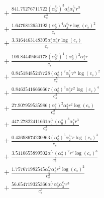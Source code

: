 \documentclass[10pt]{article}
\begin{document}
\begin{align*}
&{}  + \frac{841.75276711722 \left(\alpha_{0}^{c_s}\right)^{3} \alpha_{0}^s \alpha_{1}^{c_s} r^{3}}{c_{s}^{3}} \\
&{}  + \frac{1.6470812650193 \left(\alpha_{0}^s\right)^{4} \alpha_{3}^{c_s} r \log{\left(c_{s} \right)}^{2}}{c_{s}} \\
&{}  + \frac{3.3164463148305 \alpha_{2}^s \alpha_{4}^s r \log{\left(c_{s} \right)}}{c_{s}} \\
&{}  + \frac{106.84449464178 \left(\alpha_{0}^{c_s}\right)^{4} \left(\alpha_{0}^s\right)^{2} \alpha_{1}^s r}{c_{s}} \\
&{}  + \frac{0.84518485247728 \left(\alpha_{0}^s\right)^{2} \alpha_{1}^{c_s} r^{5} \log{\left(c_{s} \right)}^{2}}{c_{s}^{5}} \\
&{}  + \frac{0.84635416666667 \left(\alpha_{0}^s\right)^{3} \alpha_{3}^s r^{2} \log{\left(c_{s} \right)}^{4}}{c_{s}^{2}} \\
&{}  + \frac{27.907959535986 \left(\alpha_{1}^s\right)^{2} \alpha_{2}^s r^{2} \log{\left(c_{s} \right)}}{c_{s}^{2}} \\
&{}  + \frac{447.27822411661 \alpha_{0}^{c_s} \left(\alpha_{0}^s\right)^{3} \alpha_{1}^s r^{3}}{c_{s}^{3}} \\
&{}  + \frac{0.43698674230963 \left(\alpha_{0}^s\right)^{5} \alpha_{2}^{c_s} r \log{\left(c_{s} \right)}^{3}}{c_{s}} \\
&{}  + \frac{3.5110655899502 \alpha_{0}^{c_s} \left(\alpha_{2}^s\right)^{2} r^{2} \log{\left(c_{s} \right)}^{3}}{c_{s}^{2}} \\
&{}  + \frac{1.757671982545 \alpha_{2}^{c_s} \alpha_{3}^s r^{2} \log{\left(c_{s} \right)}^{2}}{c_{s}^{2}} \\
&{}  + \frac{56.654719325366 \alpha_{0}^{c_s} \alpha_{0}^s \alpha_{3}^{c_s} r^{3}}{c_{s}^{3}}
\end{align*}
\end{document}
